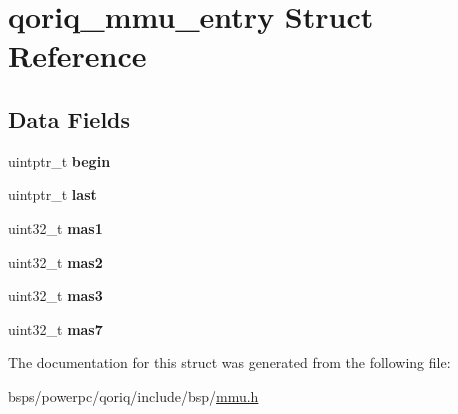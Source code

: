 \hypertarget{structqoriq__mmu__entry}{}\section{qoriq\+\_\+mmu\+\_\+entry Struct Reference}
\label{structqoriq__mmu__entry}
\subsection*{Data Fields}
\begin{DoxyCompactItemize}
\item 
\mbox{\label{structqoriq__mmu__entry_a5b2a5949740940d5cf0d95b1f41f458e}} 
uintptr\+\_\+t {\bfseries begin}
\item 
\mbox{\label{structqoriq__mmu__entry_a9c31614089538016506a03457fbb2877}} 
uintptr\+\_\+t {\bfseries last}
\item 
\mbox{\label{structqoriq__mmu__entry_a1928288a680e1b369b6f98a63c9196ec}} 
uint32\+\_\+t {\bfseries mas1}
\item 
\mbox{\label{structqoriq__mmu__entry_ac00ec41c7f724dee7d7b497732ffc721}} 
uint32\+\_\+t {\bfseries mas2}
\item 
\mbox{\label{structqoriq__mmu__entry_af9247baef3d0fc62d02f354a52ecbe20}} 
uint32\+\_\+t {\bfseries mas3}
\item 
\mbox{\label{structqoriq__mmu__entry_a292d9924b68ea8af065070f980c25ebf}} 
uint32\+\_\+t {\bfseries mas7}
\end{DoxyCompactItemize}


The documentation for this struct was generated from the following file\+:\begin{DoxyCompactItemize}
\item 
bsps/powerpc/qoriq/include/bsp/\mbox{\hyperlink{powerpc_2qoriq_2include_2bsp_2mmu_8h}{mmu.\+h}}\end{DoxyCompactItemize}
